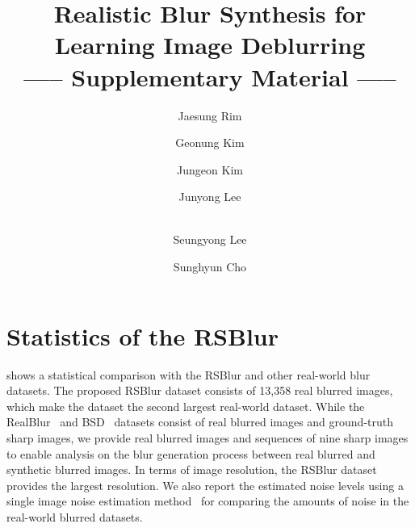 
\title{Realistic Blur Synthesis for Learning Image Deblurring \\
—– Supplementary Material —–} 

\begin{comment}
\titlerunning{ECCV-22 submission ID \ECCVSubNumber} 
\authorrunning{ECCV-22 submission ID \ECCVSubNumber} 
\author{Anonymous ECCV submission}
\institute{Paper ID \ECCVSubNumber}
\end{comment}


\author{Jaesung Rim \and
Geonung Kim \and
Jungeon Kim \and
Junyong Lee \and \\
Seungyong Lee \and
Sunghyun Cho}
\maketitle

\section{Statistics of the RSBlur}

 shows a statistical comparison with the RSBlur and other real-world blur datasets.
The proposed RSBlur dataset consists of 13,358 real blurred images, which make the dataset the second largest real-world dataset.
While the RealBlur~\cite{jsrim-ECCV2020} and BSD~\cite{Zhong_2020_ECCV,Zhong_2021_arxiv} datasets consist of real blurred images and ground-truth sharp images, we provide real blurred images and sequences of nine sharp images to enable analysis on the blur generation process between real blurred and synthetic blurred images. In terms of image resolution, the RSBlur dataset provides the largest resolution.
We also report the estimated noise levels using a single image noise estimation method~\cite{Chen-ICCV15} for comparing the amounts of noise in the real-world blurred datasets.


\begin{table}[h]
\centering
\setlength{\tabcolsep}{3.0pt}
\caption{Statistical comparison of real-world blur datasets. The average noise levels are estimated using a single image noise estimation method~\cite{Chen-ICCV15}.}
\label{tbl:statistical_reports}
\end{table}

